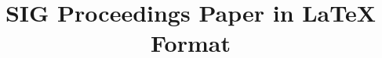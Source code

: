 \documentclass[sigconf]{acmart}
\begin{document}
\title{SIG Proceedings Paper in LaTeX Format}



%












\begin{abstract}

\end{abstract}

%
%





\maketitle




 
\end{document}
